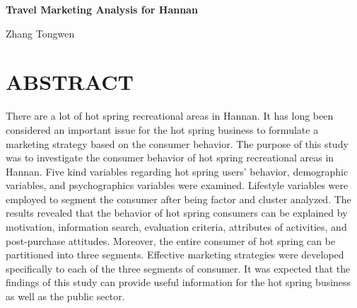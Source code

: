 \documentclass[12pt]{ctexart}
\begin{document}
\begin{abstract}
汉南地区拥有多处天然温泉，形成独具特色的温泉旅游。为扩展旅游市场， 温泉游憩业者如何依据游客的消费行为，进而拟定适当的营销策略，已成为温泉 游憩经营管理之重要课题。因此，本文旨在探讨汉南市温泉游憩区游客之消费行 为，以五类游憩行为变量、人口统计变量及心理学变量来进行调查，并通过因素 分析及集群分析，以生活型态变量来进行市场区隔。研究结果显示温泉游憩区游 客的消费行为可以旅游动机、信息来源、评估准则、活动特性与事后态度等方面 给予解释。此外，可将整体温泉旅游之消费群划分为三个相对独立的市场，并对 此三个市场研拟有效的营销策略。本研究之结果可为旅游从业人员有益的信息，对旅游主管部门也有一定参考价值。

\vspace{0.35cm}

关键词：韩南地区\quad 温泉旅游\quad 营销策略
\end{abstract}
\newpage
\thispagestyle{plain}
\begin{center}
{\bf{}Travel Marketing Analysis for Hannan}

\vspace{0.6cm}

{Zhang Tongwen}
\end{center}

\section*{ABSTRACT}
There are a lot of hot spring recreational areas in Hannan. It has long been considered an important issue for the hot spring business to formulate a marketing strategy based on the consumer behavior. The purpose of this study was to investigate the consumer behavior of hot spring recreational areas in Hannan. Five kind variables regarding hot spring users’ behavior, demographic variables, and psychographics variables were examined. Lifestyle variables were employed to segment the consumer after being factor and cluster analyzed. The results revealed that the behavior of hot spring consumers can be explained by motivation, information search, evaluation criteria, attributes of activities, and post-purchase attitudes. Moreover, the entire consumer of hot spring can be partitioned into three segments. Effective marketing strategies were developed specifically to each of the three segments of consumer. It was expected that the findings of this study can provide useful information for the hot spring business as well as the public sector.
\end{document}
